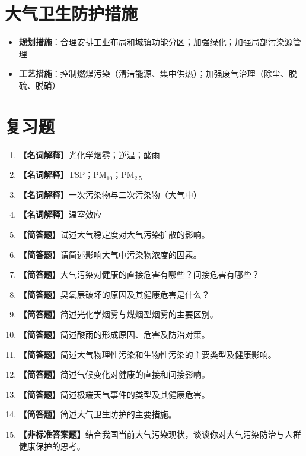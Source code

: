 \section{大气卫生防护措施}

\begin{itemize}[leftmargin=*]
    \item \textbf{规划措施}：合理安排工业布局和城镇功能分区；加强绿化；加强局部污染源管理
    \item \textbf{工艺措施}：控制燃煤污染（清洁能源、集中供热）；加强废气治理（除尘、脱硫、脱硝）
\end{itemize}

\section{复习题}

\begin{enumerate}[leftmargin=*, itemsep=8pt]
    \item \textbf{【名词解释】}光化学烟雾；逆温；酸雨
    \item \textbf{【名词解释】}TSP；PM$_{10}$；PM$_{2.5}$
    \item \textbf{【名词解释】}一次污染物与二次污染物（大气中）
    \item \textbf{【名词解释】}温室效应
    \item \textbf{【简答题】}试述大气稳定度对大气污染扩散的影响。
    \item \textbf{【简答题】}请简述影响大气中污染物浓度的因素。
    \item \textbf{【简答题】}大气污染对健康的直接危害有哪些？间接危害有哪些？
    \item \textbf{【简答题】}臭氧层破坏的原因及其健康危害是什么？
    \item \textbf{【简答题】}简述光化学烟雾与煤烟型烟雾的主要区别。
    \item \textbf{【简答题】}简述酸雨的形成原因、危害及防治对策。
    \item \textbf{【简答题】}简述大气物理性污染和生物性污染的主要类型及健康影响。
    \item \textbf{【简答题】}简述气候变化对健康的直接和间接影响。
    \item \textbf{【简答题】}简述极端天气事件的类型及其健康危害。
    \item \textbf{【简答题】}简述大气卫生防护的主要措施。
    \item \textbf{【非标准答案题】}结合我国当前大气污染现状，谈谈你对大气污染防治与人群健康保护的思考。
\end{enumerate}

